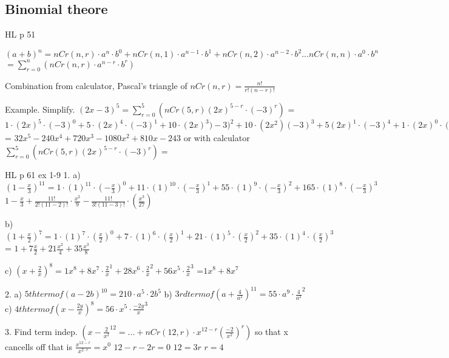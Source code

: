 \subsection{Binomial theore}
HL p 51 

$(a+b)^n=nCr(n, r)\cdot a^n\cdot b^0+nCr(n,1)\cdot a^{n-1}\cdot b^1+nCr(n,2)\cdot a^{n-2}\cdot b^2...nCr(n,n)\cdot a^0\cdot b^n$
$=\sum_{r=0}^{n}(nCr(n,r)\cdot a^{n-r}\cdot b^r)$

Combination from calculator, Pascal's triangle of $nCr(n,r)=\frac{n!}{r!(n-r)!}$

Example. Simplify.
$(2x-3)^5=\sum_{r=0}^{5}(nCr(5,r)(2x)^{5-r}\cdot (-3)^r)$
= $1\cdot(2x)^5\cdot(-3)^0+5\cdot(2x)^4\cdot(-3)^1+10\cdot(2x)^3)-3)^2+10\cdot(2x^2)(-3)^3+5(2x)^1\cdot(-3)^4+1\cdot(2x)^0\cdot(-3)^5$
= $32x^5-240x^4+720x^3-1080x^2+810x-243$
or with calculator $\sum_{r=0}^{5}(nCr(5,r)(2x)^{5-r}\cdot (-3)^r)=$

HL p 61 ex 1-9
1. 
a) $(1-\frac{x}{3})^{11}=1\cdot(1)^11\cdot(-\frac{x}{3})^0 
+11\cdot(1)^10\cdot(-\frac{x}{3})^1
+55\cdot(1)^9\cdot(-\frac{x}{3})^2
+165\cdot(1)^8\cdot(-\frac{x}{3})^3$
$1-\frac{x}{3}+\frac{11!}{2!(11-2)!}\cdot\frac{x^2}{9}-\frac{11!}{3!(11-3)!}\cdot(\frac{x^3}{27})$

b) $(1+\frac{x}{2})^7=1\cdot(1)^7\cdot(\frac{x}{2})^0
+7\cdot(1)^6\cdot(\frac{x}{2})^1
+21\cdot(1)^5\cdot(\frac{x}{2})^2
+35\cdot(1)^4\cdot(\frac{x}{2})^3$
= $1+7\frac{x}{2}+21\frac{x^2}{4}+35\frac{x^3}{8}$

c) $(x+\frac{2}{x})^8=1x^8
+8x^7\cdot\frac{2}{x}^1
+28x^6\cdot\frac{2}{x}^2
+56x^5\cdot\frac{2}{x}^3$
=$1x^8+8x^7$

2. 
a) $5th term of (a-2b)^{10}=210\cdot a^5\cdot 2b^5$
b) $3rd term of (a+\frac{4}{a^2})^{11}=55\cdot a^9\cdot\frac{4}{a^2}^2$
c) $4th term of (x-\frac{2y}{x})^8=56\cdot x^5\cdot\frac{-2y}{x}^3$

3. Find term indep.
$(x-\frac{2}{x^2}^{12}=...+nCr(12,r)\cdot x^{12-r}(\frac{-2}{x^2})^r)$
so that x cancells off that is 
$\frac{x^{12-r}}{x^{2\cdot r}}=x^0$
$12-r-2r=0$
$12=3r$
$r=4$
